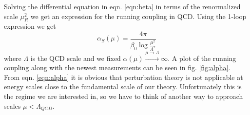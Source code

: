 Solving the differential equation in eqn. \ref{eqn:beta} in terms of the renormalized scale $\mu_R^2$ we get an expression for the running coupling in QCD. Using the 1-loop expression we get
\begin{equation}
\label{eqn:alpha}
\alpha_S(\mu) = \frac{4\pi}{\beta_0 \log\frac{\mu^2}{\Lambda^2}} 
\end{equation}
where $\Lambda$ is the QCD scale and we fixed $\alpha(\mu) \overset{\mu \rightarrow \Lambda}{\longrightarrow} \infty$. A plot of the running coupling along with the newest measurements can be seen in fig. \ref{fig:alpha}. \\
From eqn. \ref{eqn:alpha} it is obvious that perturbation theory is not applicable at energy scales close to the fundamental scale of our theory. Unfortunately this is the regime we are interested in, so we have to think of another way to approach scales $\mu < \Lambda_{QCD}$. 
